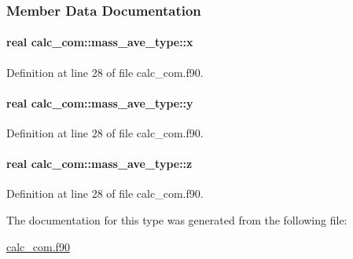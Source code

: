 \subsubsection{Member Data Documentation}
\hypertarget{structcalc__com_1_1mass__ave__type_a39bc0721c8f812198dcdef36e9c2db09}{
\paragraph[{x}]{\setlength{\rightskip}{0pt plus 5cm}real calc\-\_\-com\-::mass\-\_\-ave\-\_\-type\-::x}}\label{structcalc__com_1_1mass__ave__type_a39bc0721c8f812198dcdef36e9c2db09}


Definition at line 28 of file calc\-\_\-com.\-f90.

\hypertarget{structcalc__com_1_1mass__ave__type_a133df3936119eab320d7b7538eaf7dd2}{
\paragraph[{y}]{\setlength{\rightskip}{0pt plus 5cm}real calc\-\_\-com\-::mass\-\_\-ave\-\_\-type\-::y}}\label{structcalc__com_1_1mass__ave__type_a133df3936119eab320d7b7538eaf7dd2}


Definition at line 28 of file calc\-\_\-com.\-f90.

\hypertarget{structcalc__com_1_1mass__ave__type_a3e3c76a0ea6e86e651beccf7aaa396b6}{
\paragraph[{z}]{\setlength{\rightskip}{0pt plus 5cm}real calc\-\_\-com\-::mass\-\_\-ave\-\_\-type\-::z}}\label{structcalc__com_1_1mass__ave__type_a3e3c76a0ea6e86e651beccf7aaa396b6}


Definition at line 28 of file calc\-\_\-com.\-f90.



The documentation for this type was generated from the following file\-:\begin{DoxyCompactItemize}
\item 
\hyperlink{calc__com_8f90}{calc\-\_\-com.\-f90}\end{DoxyCompactItemize}
